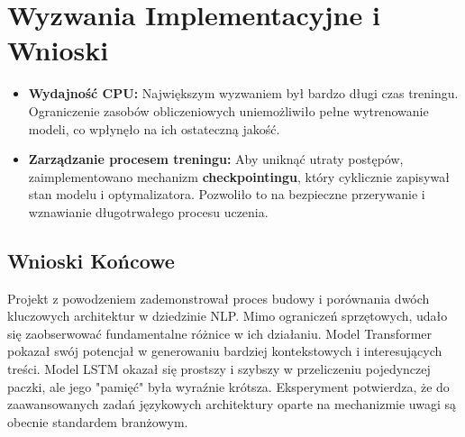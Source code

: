 \documentclass[11pt, a4paper]{article}
\begin{document}
\section{Wyzwania Implementacyjne i Wnioski}

\begin{itemize}
    \item \textbf{Wydajność CPU:} Największym wyzwaniem był bardzo długi czas treningu. Ograniczenie zasobów obliczeniowych uniemożliwiło pełne wytrenowanie modeli, co wpłynęło na ich ostateczną jakość.
    \item \textbf{Zarządzanie procesem treningu:} Aby uniknąć utraty postępów, zaimplementowano mechanizm \textbf{checkpointingu}, który cyklicznie zapisywał stan modelu i optymalizatora. Pozwoliło to na bezpieczne przerywanie i wznawianie długotrwałego procesu uczenia.
\end{itemize}

\subsection{Wnioski Końcowe}
Projekt z powodzeniem zademonstrował proces budowy i porównania dwóch kluczowych architektur w dziedzinie NLP. Mimo ograniczeń sprzętowych, udało się zaobserwować fundamentalne różnice w ich działaniu. Model Transformer pokazał swój potencjał w generowaniu bardziej kontekstowych i interesujących treści. Model LSTM okazał się prostszy i szybszy w przeliczeniu pojedynczej paczki, ale jego "pamięć" była wyraźnie krótsza. Eksperyment potwierdza, że do zaawansowanych zadań językowych architektury oparte na mechanizmie uwagi są obecnie standardem branżowym.
\end{document}
